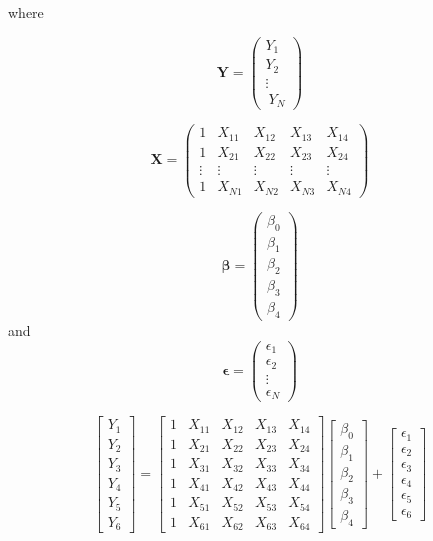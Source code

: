 \documentclass[
  letterpaper,
  DIV=11,
  numbers=noendperiod]{scrartcl}
\begin{document}
where

\[ 
\mathbf{Y} =
\begin{pmatrix} 
Y_1 \\ 
Y_2 \\ 
\vdots \\
\ Y_N 
\end{pmatrix}
\]

\[ 
\mathbf{X} =
\begin{pmatrix}
1 & X_{11} & X_{12} & X_{13} & X_{14} \\
1 & X_{21} & X_{22} & X_{23} & X_{24} \\
\vdots & \vdots & \vdots & \vdots & \vdots \\
1 & X_{N1} & X_{N2} & X_{N3} & X_{N4}
\end{pmatrix}
\]

\[ 
\boldsymbol{\beta} =
\begin{pmatrix} 
\beta_0 \\ 
\beta_1 \\ 
\beta_2 \\ 
\beta_3 \\ 
\beta_4 
\end{pmatrix}
\] and \[ 
\boldsymbol{\epsilon} =
\begin{pmatrix}
\epsilon_1 \\
\epsilon_2 \\
\vdots \\
\epsilon_N
\end{pmatrix}
\]

\[
\begin{bmatrix}
Y_1 \\
Y_2 \\
Y_3 \\
Y_4 \\
Y_5 \\
Y_6
\end{bmatrix}
=
\begin{bmatrix}
1 & X_{11} & X_{12} & X_{13} & X_{14} \\
1 & X_{21} & X_{22} & X_{23} & X_{24} \\
1 & X_{31} & X_{32} & X_{33} & X_{34} \\
1 & X_{41} & X_{42} & X_{43} & X_{44} \\
1 & X_{51} & X_{52} & X_{53} & X_{54} \\
1 & X_{61} & X_{62} & X_{63} & X_{64}
\end{bmatrix}
\begin{bmatrix}
\beta_0 \\
\beta_1 \\
\beta_2 \\
\beta_3 \\
\beta_4
\end{bmatrix}
+
\begin{bmatrix}
\epsilon_1 \\
\epsilon_2 \\
\epsilon_3 \\
\epsilon_4 \\
\epsilon_5 \\
\epsilon_6
\end{bmatrix}
\]
\end{document}
